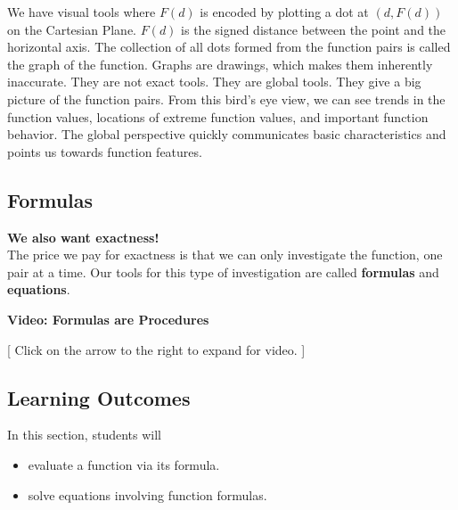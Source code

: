 \documentclass{ximera}
\begin{document}
We have visual tools where $F(d)$ is encoded by plotting a dot at $(d, F(d))$ on the Cartesian Plane.  $F(d)$ is the signed distance between the point and the horizontal axis. The collection of all dots formed from the function pairs is called the graph of the function. Graphs are drawings, which makes them inherently inaccurate.  They are not exact tools.  They are global tools.  They give a big picture of the function pairs.  From this bird's eye view, we can see trends in the function values, locations of extreme function values, and important function behavior. The global perspective quickly communicates basic characteristics and points us towards function features.












\subsection*{Formulas}
\textbf{\textcolor{red!70!black}{We also want exactness!}} \\


The price we pay for exactness is that we can only investigate the function, one pair at a time.  Our tools for this type of investigation are called \textbf{formulas} and \textbf{equations}.








\begin{explanation} \textbf{Video: Formulas are Procedures}

[ Click on the arrow to the right to expand for video. ]
\begin{expandable} 

\begin{center}
\end{center}

\end{expandable}
\end{explanation}






\subsection*{Learning Outcomes}

\begin{sectionOutcomes}
In this section, students will 

\begin{itemize}
\item evaluate a function via its formula.
\item solve equations involving function formulas.
\end{itemize}
\end{sectionOutcomes}
\end{document}
